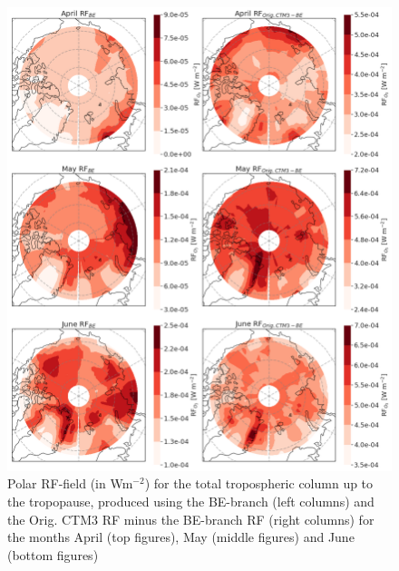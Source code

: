 \begin{figure}[ht]
    \centering
    \includegraphics[width = \linewidth]{Chapter6_Results/images/RF/BEOrig_RF_polar_AprJune_2001.png}
    \caption{Polar RF-field (in Wm$^{-2}$) for the total tropospheric column up to the tropopause, produced using the BE-branch (left columns) and the Orig. CTM3 RF minus the BE-branch RF (right columns) for the months April (top figures), May (middle figures) and June (bottom figures)}
    \label{fig:BEorig_RF_global_AprJune_2001}
\end{figure}
